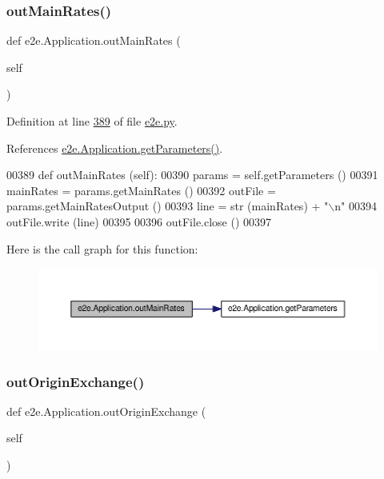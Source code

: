 \subsubsection{\texorpdfstring{out\+Main\+Rates()}{outMainRates()}}
{\footnotesize\ttfamily def e2e.\+Application.\+out\+Main\+Rates (\begin{DoxyParamCaption}\item[{}]{self }\end{DoxyParamCaption})}



Definition at line \hyperlink{e2e_8py_source_l00389}{389} of file \hyperlink{e2e_8py_source}{e2e.\+py}.



References \hyperlink{e2e_8py_source_l00386}{e2e.\+Application.\+get\+Parameters()}.


\begin{DoxyCode}
00389     \textcolor{keyword}{def }outMainRates (self):
00390         params = self.getParameters ()
00391         mainRates = params.getMainRates ()
00392         outFile = params.getMainRatesOutput ()
00393         line = str (mainRates) + \textcolor{stringliteral}{"\(\backslash\)n"}
00394         outFile.write (line)
00395         
00396         outFile.close ()
00397     
\end{DoxyCode}
Here is the call graph for this function\+:
\nopagebreak
\begin{figure}[H]
\begin{center}
\leavevmode
\includegraphics[width=350pt]{classe2e_1_1_application_a3e33fd00d85637393d48ea3f7dbd95c7_cgraph}
\end{center}
\end{figure}
\mbox{\label{classe2e_1_1_application_adfad90d64cddb8d751961202264ca489}} 
\subsubsection{\texorpdfstring{out\+Origin\+Exchange()}{outOriginExchange()}}
{\footnotesize\ttfamily def e2e.\+Application.\+out\+Origin\+Exchange (\begin{DoxyParamCaption}\item[{}]{self }\end{DoxyParamCaption})}



